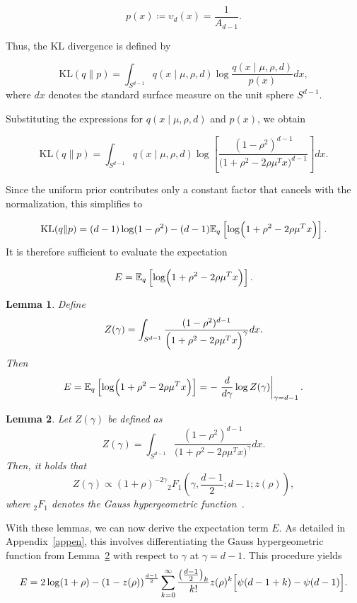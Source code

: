 \documentclass{article}
\newtheorem{lemma}{Lemma}
\begin{document}
\[
p(x) \coloneq \upsilon_d(x)  = \frac{1}{A_{d-1}}.
\]

Thus, the KL divergence is defined by

\[
\mathrm{KL}(q\|p) = \int_{S^{d-1}} q(x \mid \mu, \rho, d)  \log \frac{q(x \mid \mu, \rho, d)}{p(x)} dx,
\]
where \(dx\) denotes the standard surface measure on the unit sphere \(S^{d-1}\).

Substituting the expressions for \(q(x \mid \mu, \rho, d)\) and \(p(x)\), we obtain

\[
\mathrm{KL}(q\|p) = \int_{S^{d-1}} q(x \mid \mu, \rho, d)  \log \left[ \frac{(1-\rho^2)^{d-1}}{\bigl(1+\rho^2-2\rho\mu^T x\bigr)^{d-1}} \right] dx.
\]

Since the uniform prior contributes only a constant factor that cancels with the normalization, this simplifies to

\[
\mathrm{KL}(q\|p) = (d-1)\log(1-\rho^2) - (d-1)\mathbb{E}_{q}\left[\log\Bigl(1+\rho^2-2\rho\mu^T x\Bigr)\right].
\]
It is therefore sufficient to evaluate the expectation

\[
E = \mathbb{E}_{q}\left[\log\Bigl(1+\rho^2-2\rho\mu^T x\Bigr)\right].
\]

\begin{lemma}\label{l1}
Define
\[
Z(\gamma)= \int_{S^{d-1}} \frac{(1-\rho^2)^{d-1}}{\Bigl(1+\rho^2-2\rho\mu^T x\Bigr)^{\gamma}}dx.
\]
Then
\[
E=\mathbb{E}_q\left[\log\Bigl(1+\rho^2-2\rho\mu^T x\Bigr)\right] = -\left.\frac{d}{d\gamma}\log Z(\gamma)\right|_{\gamma=d-1}.
\]
\end{lemma}



\begin{lemma}\label{l2}
Let $Z(\gamma)$ be defined as
\begin{equation*}
    Z(\gamma) = \int_{S^{d-1}} \frac{(1 - \rho^2)^{d-1}}{\big(1 + \rho^2 - 2\rho \mu^T x\big)^{\gamma}}  dx.
\end{equation*}
Then, it holds that
\begin{equation}
    Z(\gamma) \propto \left(1 + \rho\right)^{-2\gamma}  {}_2F_1 \left(\gamma, \frac{d-1}{2}; d-1; z(\rho) \right),
\end{equation}
where \({}_2F_1\) denotes the Gauss hypergeometric function~\citep[15.2.1]{watson:DLMF}.
\end{lemma}


With these lemmas, we can now derive the expectation term \(E\). As detailed in Appendix~\ref{appen}, this involves differentiating the Gauss hypergeometric function from Lemma~\ref{l2} with respect to \(\gamma\) at \(\gamma=d-1\). This procedure yields
\begin{equation}\label{eq:expectation_E}
E = 2\log(1+\rho) - \left(1 - z(\rho)\right)^{\frac{d-1}{2}} \sum_{k=0}^{\infty} \frac{\left(\frac{d-1}{2}\right)_k}{k!} z(\rho)^k \Bigl[ \psi(d-1+k) - \psi(d-1) \Bigr].
\end{equation}
\end{document}
